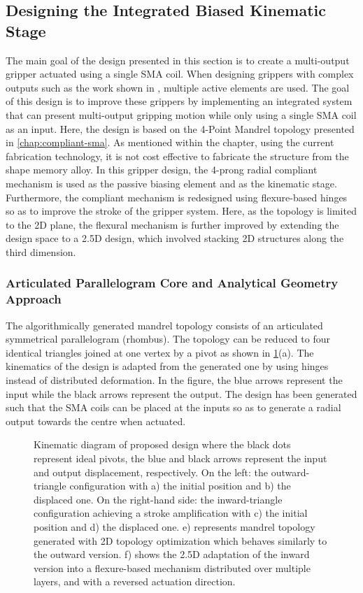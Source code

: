 \subsection{Designing the Integrated Biased Kinematic Stage}
The main goal of the design presented in this section is to create a multi-output gripper actuated using a single SMA coil. When designing grippers with complex outputs such as the work shown in \todocite, multiple active elements are used. The goal of this design is to improve these grippers by implementing an integrated system that can present multi-output gripping motion while only using a single SMA coil as an input. Here, the design is based on the 4-Point Mandrel topology presented in \cref{chap:compliant-sma}. As mentioned within the chapter, using the current fabrication technology, it is not cost effective to fabricate the structure from the shape memory alloy. In this gripper design, the 4-prong radial compliant mechanism is used as the passive biasing element and as the kinematic stage. Furthermore, the compliant mechanism is redesigned using flexure-based hinges so as to improve the stroke of the gripper system. Here, as the topology is limited to the 2D plane, the flexural mechanism is further improved by extending the design space to a 2.5D design, which involved stacking 2D structures along the third dimension.
\subsubsection{Articulated Parallelogram Core and Analytical Geometry Approach}
The algorithmically generated mandrel topology consists of an articulated symmetrical parallelogram (rhombus). The topology can be reduced to four identical triangles joined at one vertex by a pivot as shown in \cref{fig:mandrel-kinematic}(a). The kinematics of the design is adapted from the generated one by using hinges instead of distributed deformation. In the figure, the blue arrows represent the input while the black arrows represent the output. The design has been generated such that the SMA coils can be placed at the inputs so as to generate a radial output towards the centre when actuated.

\begin{figure}[t] %
  \centering
  \resizebox{\textwidth}{!}{}
  \caption{Kinematic diagram of proposed design where the black dots represent ideal pivots, the blue and black arrows represent the input and output displacement, respectively. On the left: the outward-triangle configuration with a) the initial position and b) the displaced one. On the right-hand side: the inward-triangle configuration achieving a stroke amplification with c) the initial position and d) the displaced one. e) represents mandrel topology generated with 2D topology optimization which behaves similarly to the outward version. f) shows the 2.5D adaptation of the inward version into a flexure-based mechanism distributed over multiple layers, and with a reversed actuation direction.}
  \label{fig:mandrel-kinematic}
\end{figure}

